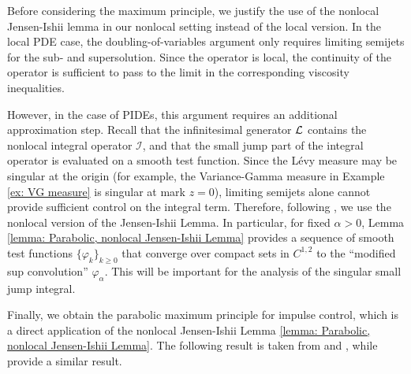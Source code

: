 Before considering the maximum principle, we justify the use of the nonlocal Jensen-Ishii lemma in our nonlocal setting instead of the local version. In the local PDE case, the doubling-of-variables argument only requires limiting semijets for the sub- and supersolution. Since the operator is local, the continuity of the operator is sufficient to pass to the limit in the corresponding viscosity inequalities. 

However, in the case of PIDEs, this argument requires an additional approximation step. Recall that the infinitesimal generator $\mathcal{L}$ contains the nonlocal integral operator $\mathcal I$, and that the small jump part of the integral operator is evaluated on a smooth test function. Since the Lévy measure may be singular at the origin (for example, the Variance-Gamma measure in Example \ref{ex: VG measure} is singular at mark $z=0$), limiting semijets alone cannot provide sufficient control on the integral term. Therefore, following \textcite{barles2008second}, we use the nonlocal version of the Jensen-Ishii Lemma. In particular, for fixed $\alpha>0$, Lemma \ref{lemma: Parabolic, nonlocal Jensen-Ishii Lemma} provides a sequence of smooth test functions $\{\varphi_k\}_{k\geq0}$ that converge over compact sets in $C^{1,2}$ to the ``modified sup convolution'' $\varphi_\alpha$. This will be important for the analysis of the singular small jump integral.

Finally, we obtain the parabolic maximum principle for impulse control, which is a direct application of the nonlocal Jensen-Ishii Lemma \ref{lemma: Parabolic, nonlocal Jensen-Ishii Lemma}. The following result is taken from \textcite{barles2008second} and \textcite{seydel2010generalexistenceuniquenessviscosity}, while \textcite{jakobsen2006maximum} provide a similar result.

